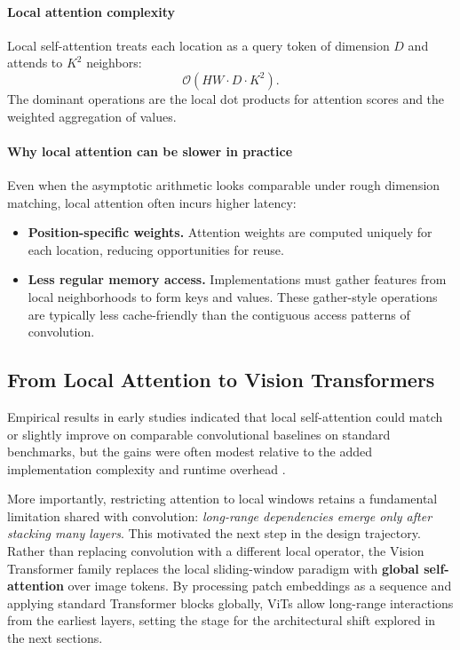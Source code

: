 \paragraph{Local attention complexity}
\noindent
Local self-attention treats each location as a query token of dimension \(D\) and attends to \(K^2\) neighbors:
\begin{equation}
	\mathcal{O}\!\left(
	H W \cdot D \cdot K^2
	\right).
	\label{eq:chapter18_local_attn_complexity}
\end{equation}
The dominant operations are the local dot products for attention scores and the weighted aggregation of values.

\paragraph{Why local attention can be slower in practice}
\noindent
Even when the asymptotic arithmetic looks comparable under rough dimension matching, local attention often incurs higher latency:
\begin{itemize}
	\item \textbf{Position-specific weights.}
	Attention weights are computed uniquely for each location, reducing opportunities for reuse.
	
	\item \textbf{Less regular memory access.}
	Implementations must gather features from local neighborhoods to form keys and values.
	These gather-style operations are typically less cache-friendly than the contiguous access patterns of convolution.
\end{itemize}

\subsection{From Local Attention to Vision Transformers}
\label{subsec:chapter18_local_attention_to_vit}

\noindent
Empirical results in early studies indicated that local self-attention could match or slightly improve on comparable convolutional baselines on standard benchmarks, but the gains were often modest relative to the added implementation complexity and runtime overhead \cite{ramachandran2019_standalone}.

\noindent
More importantly, restricting attention to local windows retains a fundamental limitation shared with convolution:
\emph{long-range dependencies emerge only after stacking many layers}.
This motivated the next step in the design trajectory.
Rather than replacing convolution with a different local operator, the Vision Transformer family replaces the local sliding-window paradigm with \textbf{global self-attention} over image tokens.
By processing patch embeddings as a sequence and applying standard Transformer blocks globally, ViTs allow long-range interactions from the earliest layers, setting the stage for the architectural shift explored in the next sections.

